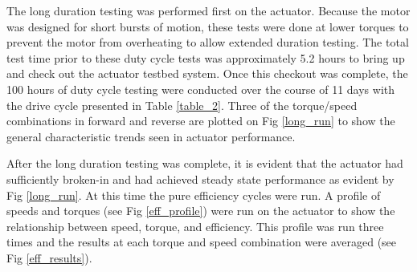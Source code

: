 


The long duration testing was performed first on the actuator.
Because the motor was designed for short bursts of motion, these tests were done at lower torques to prevent the motor from overheating to allow extended duration testing.
The total test time prior to these duty cycle tests was approximately 5.2 hours to bring up and check out the actuator testbed system.
Once this checkout was complete, the 100 hours of duty cycle testing were conducted over the course of 11 days with the drive cycle presented in Table \ref{table_2}.
Three of the torque/speed combinations in forward and reverse are plotted on Fig \ref{long_run} to show the general characteristic trends seen in actuator performance.

After the long duration testing was complete, it is evident that the actuator had sufficiently broken-in and had achieved steady state performance as evident by Fig \ref{long_run}. At this time the pure efficiency cycles were run.
A profile of speeds and torques (see Fig \ref{eff_profile}) were run on the actuator to show the relationship between speed, torque, and efficiency.
This profile was run three times and the results at each torque and speed combination were averaged (see Fig \ref{eff_results}).

